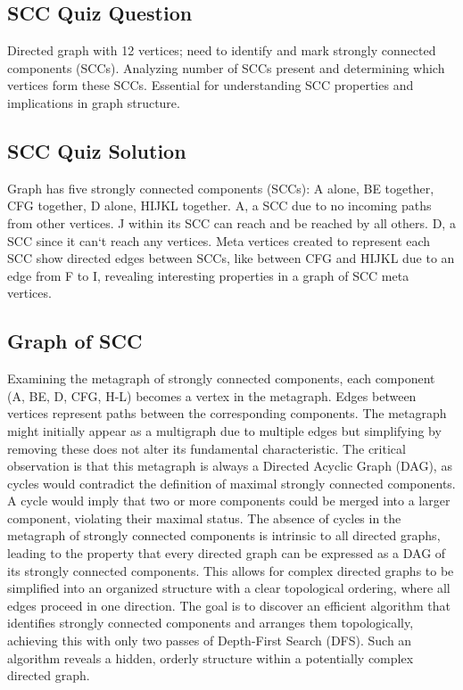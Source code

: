 \subsection*{SCC Quiz Question}
Directed graph with 12 vertices; need to identify and mark strongly connected components (SCCs).
Analyzing number of SCCs present and determining which vertices form these SCCs.
Essential for understanding SCC properties and implications in graph structure.

\subsection*{SCC Quiz Solution}
Graph has five strongly connected components (SCCs): A alone, BE together, CFG together, D alone, HIJKL together.
A, a SCC due to no incoming paths from other vertices.
J within its SCC can reach and be reached by all others.
D, a SCC since it can`t reach any vertices.
Meta vertices created to represent each SCC show directed edges between SCCs, like between CFG and HIJKL due to an edge from F to I, revealing interesting properties in a graph of SCC meta vertices.

\subsection*{Graph of SCC}
Examining the metagraph of strongly connected components, each component (A, BE, D, CFG, H-L) becomes a vertex in the metagraph.
Edges between vertices represent paths between the corresponding components.
The metagraph might initially appear as a multigraph due to multiple edges but simplifying by removing these does not alter its fundamental characteristic.
The critical observation is that this metagraph is always a Directed Acyclic Graph (DAG), as cycles would contradict the definition of maximal strongly connected components.
A cycle would imply that two or more components could be merged into a larger component, violating their maximal status.
The absence of cycles in the metagraph of strongly connected components is intrinsic to all directed graphs, leading to the property that every directed graph can be expressed as a DAG of its strongly connected components.
This allows for complex directed graphs to be simplified into an organized structure with a clear topological ordering, where all edges proceed in one direction.
The goal is to discover an efficient algorithm that identifies strongly connected components and arranges them topologically, achieving this with only two passes of Depth-First Search (DFS).
Such an algorithm reveals a hidden, orderly structure within a potentially complex directed graph.

